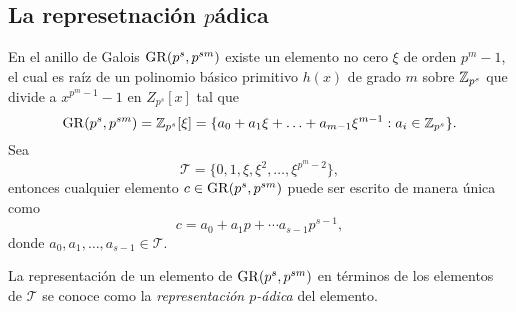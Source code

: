 \subsection{La represetnación \texorpdfstring{$p$}-ádica}

\begin{theorem}
  En el anillo de Galois $\operatorname{GR}(p^{s}, p^{sm})$ existe un
  elemento no cero $\xi$ de orden $p^{m}-1$, el cual es raíz
  de un polinomio básico primitivo $h(x)$ de grado $m$ sobre
  $\operatorname{\mathbb{Z}}_{p^{s}}$ que divide a $x^{p^{m}-1} - 1$ en
  $Z_{p^{s}}[x]$ tal que
  \begin{equation}
    \operatorname{GR}(p^{s},p^{sm})
    = \operatorname{\mathbb{Z}}_{p^{s}}[\xi]
    = \{a_0+a_1\xi+\ldots+a_{m-1}\xi^{m-1} : a_i \in
    \operatorname{\mathbb{Z}}_{p^{s}}\}.
  \end{equation}
  Sea
  \begin{equation}
    \mathcal T
    = \{0,1,\xi,\xi^2,\ldots,\xi^{p^{m}-2}\},
  \end{equation}
  entonces cualquier elemento $c \in \operatorname{GR}(p^{s},p^{sm})$ 
  puede ser escrito de manera única como
  \[
    c = a_0 + a_1p + \cdots a_{s-1}p^{s-1},
  \] 
  donde $a_0,a_1,\ldots,a_{s-1} \in \mathcal T$.
\end{theorem}
La representación de un elemento de $\operatorname{GR}(p^{s},p^{sm})$ en
términos de los elementos de $\mathcal T$ se conoce como la
\textit{representación $p$-ádica} del elemento.
